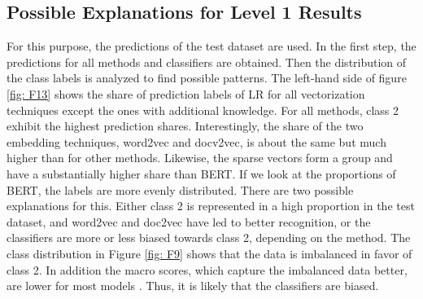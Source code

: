 \documentclass[12pt, a4paper, titlepage]{article}
\begin{document}
\subsection*{Possible Explanations for Level 1 Results}
For this purpose, the predictions of the test dataset are used. In the first step, the predictions for all methods and classifiers are obtained. Then the distribution of the class labels is analyzed to find possible patterns. The left-hand side of figure \ref{fig: F13} shows the share of prediction labels of \ac{LR} for all vectorization techniques except the ones with additional knowledge. For all methods, class 2 exhibit the highest prediction shares. 
Interestingly, the share of the two embedding techniques, word2vec and docv2vec, is about the same but much higher than for other methods. Likewise, the sparse vectors form a group and have a substantially higher share than \ac{BERT}. If we look at the proportions of \ac{BERT}, the labels are more evenly distributed. There are two possible explanations for this. Either class 2 is represented in a high proportion in the test dataset, and word2vec and doc2vec have led to better recognition, or the classifiers are more or less biased towards class 2, depending on the method. The class distribution in Figure \ref{fig: F9} shows that the data is imbalanced in favor of class 2. In addition the macro scores, which capture the imbalanced data better, are lower for most models . Thus, it is likely that the classifiers are biased. 
\end{document}
